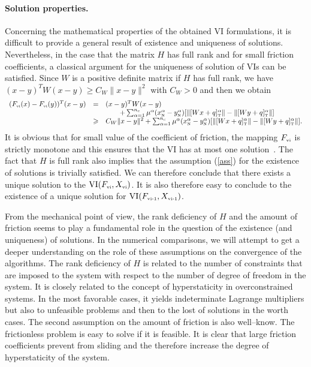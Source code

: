 \paragraph{Solution properties.} 
Concerning the mathematical properties of the obtained VI formulations, it is difficult to provide a general result of existence and uniqueness of solutions. Nevertheless, in the case that the matrix $H$ has full rank and for small friction coefficients, a classical argument for the uniqueness of solution of VIs can be satisfied. Since $W$ is a positive definite matrix if $H$ has full rank, we have  $(x-y)^T W (x-y) \geq C_W \|x-y\|^2$ with  $C_W>0$ and then we obtain
\begin{equation}
  \label{eq:mono-II}
  \begin{array}{rcl}
    (F_{\vitwo}(x)-F_{\vitwo}(y))^T(x-y) &=& (x-y)^T W (x-y)  \\
    &  & \quad\quad + \sum _{\alpha =1}^{n_c} \mu^\alpha (x^\alpha_\n-y^\alpha_\n) [\|[Wx+q]^\alpha_\t \| - \|[Wy+q]^\alpha_\t \|] \\
    & \geq & C_W \|x-y\|^2  + \sum _{\alpha =1}^{n_c} \mu^\alpha (x^\alpha_\n-y^\alpha_\n) [\|[Wx+q]^\alpha_\t \| - \|[Wy+q]^\alpha_\t \|].
  \end{array}
\end{equation}
It is obvious that for small value of the coefficient of friction, the mapping $F_{\hbox{\tiny{vi}}}$ is strictly monotone and this ensures that the VI has at most one solution~\citep[Theorem 2.3.3]{Facchinei.Pang2003}. The fact that $H$ is full rank also implies that the assumption (\ref{ass}) for the existence of solutions is trivially satisfied. We can therefore conclude that there exists a unique solution to the $\mathrm{VI}(F_{{\hbox{\tiny{vi}}}},X_{{\hbox{\tiny{vi}}}})$. It is also therefore easy to conclude to the existence of a unique solution for  $\mathrm{VI}(F_{{\hbox{\tiny{vi-1}}}},X_{{\hbox{\tiny{vi-1}}}})$.

From the mechanical point of view, the rank deficiency of $H$ and the amount of friction seems to play a fundamental role in the question of the existence (and uniqueness) of solutions. In the numerical comparisons, we will attempt to get a deeper understanding on the role of these assumptions on the convergence of the algorithms. The rank deficiency  of $H$ is related to the number of constraints that are imposed to the system with respect to the number of degree of freedom in the system. It is closely related to the concept of hyperstaticity in overconstrained systems. In the most favorable cases, it yields  indeterminate Lagrange multipliers but also to unfeasible problems and then to the lost of solutions in the worth cases. The second assumption on the amount of friction is also well--know. The frictionless problem is  easy to solve if it is  feasible. It is clear that large friction coefficients prevent from sliding and the therefore increase the degree of hyperstaticity of the system. 


